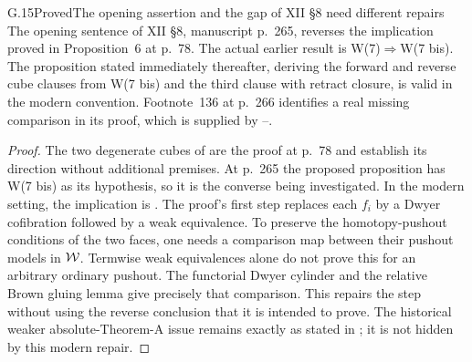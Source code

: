 \begin{claim}{G.15}{Proved}{The opening assertion and the gap of XII \S8 need different repairs}
The opening sentence of XII \S8, manuscript p.~265, reverses the implication proved in Proposition~6 at p.~78. The actual earlier result is W(7)$\Rightarrow$W(7 bis). The proposition stated immediately thereafter, deriving the forward and reverse cube clauses from W(7 bis) and the third clause with retract closure, is valid in the modern convention. Footnote~136 at p.~266 identifies a real missing comparison in its proof, which is supplied by --.
\end{claim}
\begin{proof}
The two degenerate cubes of  are the proof at p.~78 and establish its direction without additional premises. At p.~265 the proposed proposition has W(7 bis) as its hypothesis, so it is the converse being investigated. In the modern setting, the implication is . The proof's first step replaces each $f_i$ by a Dwyer cofibration followed by a weak equivalence. To preserve the homotopy-pushout conditions of the two faces, one needs a comparison map between their pushout models in $\mathcal{W}$. Termwise weak equivalences alone do not prove this for an arbitrary ordinary pushout. The functorial Dwyer cylinder and the relative Brown gluing lemma give precisely that comparison. This repairs the step without using the reverse conclusion that it is intended to prove. The historical weaker absolute-Theorem-A issue remains exactly as stated in ; it is not hidden by this modern repair.
\end{proof}

